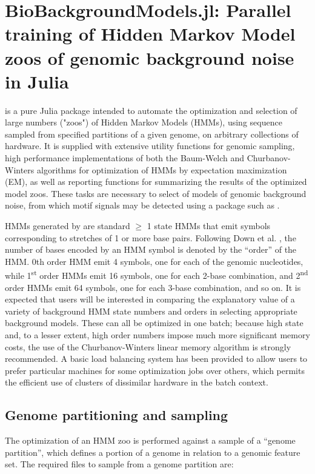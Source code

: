 \chapter{BioBackgroundModels.jl: Parallel training of Hidden Markov Model zoos of genomic background noise in Julia}
\label{ch:BBM}

 is a pure Julia package intended to automate the optimization and selection of large numbers ("zoos") of Hidden Markov Models (HMMs), using sequence sampled from specified partitions of a given genome, on arbitrary collections of hardware. It is supplied with extensive utility functions for genomic sampling, high performance implementations of both the Baum-Welch and Churbanov-Winters algorithms for optimization of HMMs by expectation maximization (EM), as well as reporting functions for summarizing the results of the optimized model zoos. These tasks are necessary to select of models of genomic background noise, from which motif signals may be detected using a package such as .

HMMs generated by  are standard $\geq$ 1 state HMMs that emit symbols corresponding to stretches of 1 or more base pairs. Following Down et al. \cite{Down2005}, the number of bases encoded by an HMM symbol is denoted by the ``order'' of the HMM. 0th order HMM emit 4 symbols, one for each of the genomic nucleotides, while 1\textsuperscript{st} order HMMs emit 16 symbols, one for each 2-base combination, and 2\textsuperscript{nd} order HMMs emit 64 symbols, one for each 3-base combination, and so on. It is expected that users will be interested in comparing the explanatory value of a variety of background HMM state numbers and orders in selecting appropriate background models. These can all be optimized in one batch; because high state and, to a lesser extent, high order numbers impose much more significant memory costs, the use of the Churbanov-Winters linear memory algorithm is strongly recommended. A basic load balancing system has been provided to allow users to prefer particular machines for some optimization jobs over others, which permits the efficient use of clusters of dissimilar hardware in the batch context.

\section{Genome partitioning and sampling}
The optimization of an HMM zoo is performed against a sample of a ``genome partition'', which defines a portion of a genome in relation to a genomic feature set. The required files to sample from a genome partition are:

